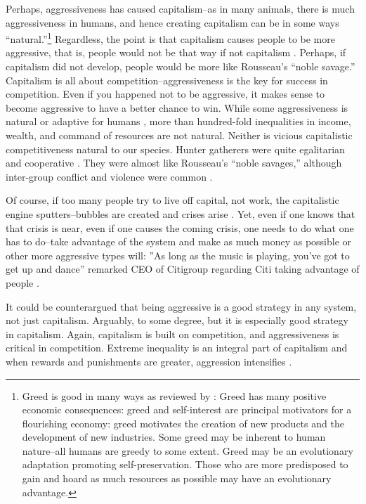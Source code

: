 \documentclass[11pt, letterpaper]{article}
\begin{document}
\begin{spacing}{2.0}
Perhaps, aggressiveness has caused capitalism--as in many animals, there is much
aggressiveness in humans, and hence creating capitalism can be in some ways
``natural.''\footnote{Greed is good in many ways as reviewed by \citet{seuntjens15b}:
Greed has many positive economic consequences: greed and self-interest are  principal
motivators for a flourishing economy: greed motivates the creation of new
products and the development of new industries. 
Some greed may be inherent to human nature--all humans are
greedy to some extent. %
Greed may be an evolutionary adaptation 
promoting self-preservation. Those who are more
predisposed to gain and hoard as much resources as possible may have an
evolutionary advantage.}
%
Regardless, the point is that capitalism causes people
to be more 
aggressive, that is, people would not be that way if not capitalism \citep{fromm64,fromm94, fromm92}. Perhaps, if 
capitalism did not develop, people would be more like Rousseau's ``noble savage.'' %
  Capitalism is all about competition--aggressiveness
is the key for success in competition. Even if you happened not to be aggressive, it makes sense
to become aggressive to have a better chance to win. %
 While some aggressiveness is  natural or adaptive  for humans
 \citep{little13}, %
 more than hundred-fold inequalities in income, wealth, and command of
 resources are  not natural. Neither is vicious capitalistic competitiveness natural to our species.
 Hunter gatherers were quite egalitarian and cooperative \citep{argyle94,bowles11,fromm92}. They were almost like Rousseau's ``noble savages,''  %
 although inter-group conflict and violence were common \citep{little13}. %

Of course, if too many people
try to live off capital, not work, the capitalistic engine sputters--bubbles are created  and crises arise \citep[e.g.,][]{harvey14}. Yet, even if one knows that that crisis is
near, even if one causes the coming crisis, one needs to do what one has to
do--take advantage of the system and make as much money as possible or other more
aggressive types will: ''As long as the music is playing, you've got to get up
and  dance'' remarked CEO of Citigroup regarding Citi taking advantage of people \citep{dealbookNYT07jul10}.

It could be counterargued that being aggressive is a good strategy in any
system,  not just capitalism. Arguably, to some degree, but it is especially good strategy in
capitalism. Again, capitalism is built on competition, and aggressiveness is
critical in competition. Extreme inequality is an integral part of capitalism
and when rewards and punishments are greater, aggression intensifies \citep{wilkinson09}.


\end{spacing}
\end{document}
